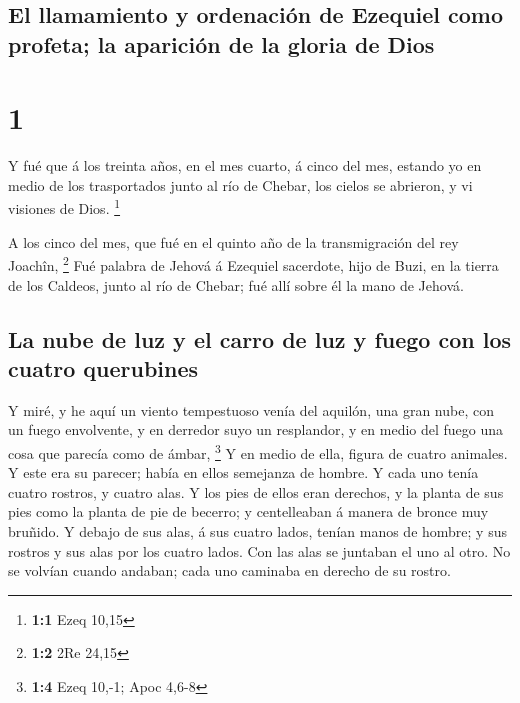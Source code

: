 \hypertarget{el-llamamiento-y-ordenaciuxf3n-de-ezequiel-como-profeta-la-apariciuxf3n-de-la-gloria-de-dios}{%
\subsection{El llamamiento y ordenación de Ezequiel como profeta; la
aparición de la gloria de
Dios}\label{el-llamamiento-y-ordenaciuxf3n-de-ezequiel-como-profeta-la-apariciuxf3n-de-la-gloria-de-dios}}

\hypertarget{section}{%
\section{1}\label{section}}

 Y fué que á los treinta años, en el mes cuarto, á cinco
del mes, estando yo en medio de los trasportados junto al río de Chebar,
los cielos se abrieron, y vi visiones de Dios. \footnote{\textbf{1:1}
  Ezeq 10,15}

 A los cinco del mes, que fué en el quinto año de la
transmigración del rey Joachîn, \footnote{\textbf{1:2} 2Re 24,15}
 Fué palabra de Jehová á Ezequiel sacerdote, hijo de Buzi,
en la tierra de los Caldeos, junto al río de Chebar; fué allí sobre él
la mano de Jehová.

\hypertarget{la-nube-de-luz-y-el-carro-de-luz-y-fuego-con-los-cuatro-querubines}{%
\subsection{La nube de luz y el carro de luz y fuego con los cuatro
querubines}\label{la-nube-de-luz-y-el-carro-de-luz-y-fuego-con-los-cuatro-querubines}}

 Y miré, y he aquí un viento tempestuoso venía del
aquilón, una gran nube, con un fuego envolvente, y en derredor suyo un
resplandor, y en medio del fuego una cosa que parecía como de ámbar,
\footnote{\textbf{1:4} Ezeq 10,-1; Apoc 4,6-8}  Y en medio
de ella, figura de cuatro animales. Y este era su parecer; había en
ellos semejanza de hombre.  Y cada uno tenía cuatro
rostros, y cuatro alas.  Y los pies de ellos eran
derechos, y la planta de sus pies como la planta de pie de becerro; y
centelleaban á manera de bronce muy bruñido.  Y debajo de
sus alas, á sus cuatro lados, tenían manos de hombre; y sus rostros y
sus alas por los cuatro lados.  Con las alas se juntaban
el uno al otro. No se volvían cuando andaban; cada uno caminaba en
derecho de su rostro.

